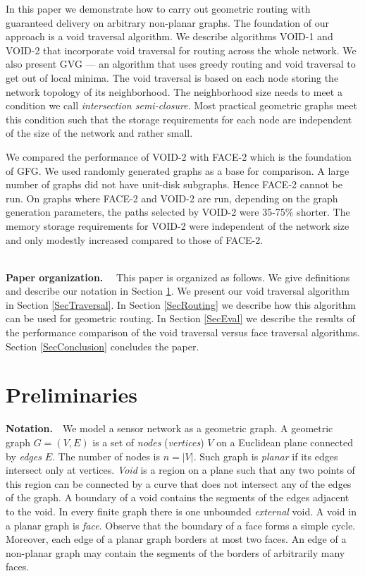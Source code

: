 \documentclass[conference]{IEEEtran}
\begin{document}
In this paper we demonstrate how to carry out geometric routing with
guaranteed delivery on arbitrary non-planar graphs. The foundation of
our approach is a void traversal algorithm. We describe algorithms
VOID-1 and VOID-2 that incorporate void traversal for routing across
the whole network. We also present GVG --- an algorithm that uses
greedy routing and void traversal to get out of local minima.  The
void traversal is based on each node storing the network topology of
its neighborhood. The neighborhood size needs to meet a condition we
call \emph{intersection semi-closure}.  Most practical geometric
graphs meet this condition such that the storage requirements for each
node are independent of the size of the network and rather small.

We compared the performance of VOID-2 with FACE-2 which is the
foundation of GFG. We used randomly generated graphs as a base for
comparison. A large number of graphs did not have unit-disk subgraphs.
Hence FACE-2 cannot be run. On graphs where FACE-2 and VOID-2 are run,
depending on the graph generation parameters, the paths selected by
VOID-2 were 35-75\% shorter. The memory storage requirements for
VOID-2 were independent of the network size and only modestly
increased compared to those of FACE-2.


\ \\ \textbf{Paper organization.} \ \ This paper is organized as
follows. We give definitions and describe our notation in Section
\ref{SecPrelim}. We present our void traversal algorithm in Section
\ref{SecTraversal}. In Section \ref{SecRouting} we describe how this
algorithm can be used for geometric routing. In Section \ref{SecEval}
we describe the results of the performance comparison of the void
traversal versus face traversal algorithms.  Section
\ref{SecConclusion} concludes the paper.


\section{Preliminaries} 
\label{SecPrelim}

\noindent
\textbf{Notation.}\ \ We model a sensor network as a geometric graph.
A geometric graph $G = (V,E)$ is a set of \emph{nodes}
(\emph{vertices}) $V$ on a Euclidean plane connected by \emph{edges}
$E$. The number of nodes is $n=|V|$. Such graph is \emph{planar} if
its edges intersect only at vertices. \emph{Void} is a region on a
plane such that any two points of this region can be connected by a
curve that does not intersect any of the edges of the graph. A
boundary of a void contains the segments of the edges adjacent to the
void. In every finite graph there is one unbounded \emph{external}
void.  A void in a planar graph is \emph{face}. Observe that the
boundary of a face forms a simple cycle. Moreover, each edge of a
planar graph borders at most two faces. An edge of a non-planar graph
may contain the segments of the borders of arbitrarily many faces.
\end{document}
